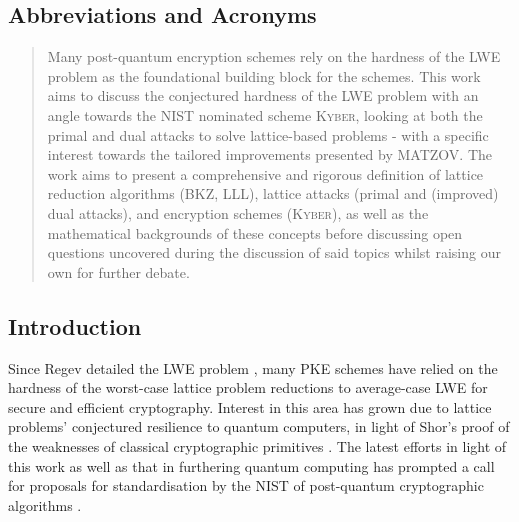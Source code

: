 \documentclass[a4paper, 10pt]{article}
\theoremstyle{definition}
\begin{document}
\subsection{Abbreviations and Acronyms
}
\begin{acronym}
\end{acronym}

\newpage

\begin{abstract}

 Many post-quantum encryption schemes rely on the hardness of the \ac{LWE} problem as the foundational building block for the schemes. This work aims to discuss the conjectured hardness of the \ac{LWE} problem with an angle towards the NIST nominated scheme \textsc{Kyber}, looking at both the primal and dual attacks to solve lattice-based problems - with a specific interest towards the tailored improvements presented by MATZOV. The work aims to present a comprehensive and rigorous definition of lattice reduction algorithms (BKZ, LLL), lattice attacks (primal and (improved) dual attacks), and encryption schemes (\textsc{Kyber}), as well as the mathematical backgrounds of these concepts before discussing open questions uncovered during the discussion of said topics whilst raising our own for further debate.

\end{abstract}

\subsection{Introduction}
Since Regev detailed the \ac{LWE} problem \cite{10.1145/1060590.1060603}, many \ac{PKE} schemes have relied on the hardness of the worst-case lattice problem reductions to average-case \ac{LWE} for secure and efficient cryptography. Interest in this area has grown due to lattice problems' conjectured resilience to quantum computers, in light of Shor's proof of the weaknesses of classical cryptographic primitives \cite{365700}. The latest efforts in light of this work as well as that in furthering quantum computing has prompted a call for proposals for standardisation by the \ac{NIST} of post-quantum cryptographic algorithms \cite{NIST}. 
\end{document}
